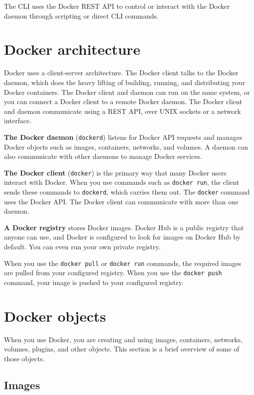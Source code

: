 \documentclass{article}
\begin{document}
The CLI uses the Docker REST API to control or interact with the Docker daemon through scripting or direct CLI commands.

	\section{Docker architecture}

Docker uses a client-server architecture. The Docker client talks to the Docker daemon, which does the heavy lifting of building, running, and distributing your Docker containers. The Docker client and daemon can run on the same system, or you can connect a Docker client to a remote Docker daemon. The Docker client and daemon communicate using a REST API, over UNIX sockets or a network interface.

\textbf{The Docker daemon} (\texttt{dockerd}) listens for Docker API requests and manages Docker objects such as images, containers, networks, and volumes. A daemon can also communicate with other daemons to manage Docker services.

\textbf{The Docker client} (\texttt{docker}) is the primary way that many Docker users interact with Docker. When you use commands such as \texttt{docker run}, the client sends these commands to \texttt{dockerd}, which carries them out. The \texttt{docker} command uses the Docker API. The Docker client can communicate with more than one daemon.

\textbf{A Docker registry} stores Docker images. Docker Hub is a public registry that anyone can use, and Docker is configured to look for images on Docker Hub by default. You can even run your own private registry.

When you use the \texttt{docker pull} or \texttt{docker run} commands, the required images are pulled from your configured registry. When you use the \texttt{docker push} command, your image is pushed to your configured registry.

	\section{Docker objects}

When you use Docker, you are creating and using images, containers, networks, volumes, plugins, and other objects. This section is a brief overview of some of those objects.

	\subsection{Images}
\end{document}
